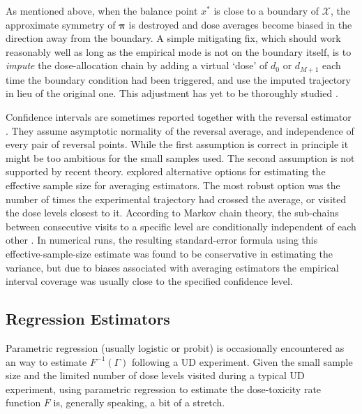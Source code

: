 As mentioned above, when the balance point $x^*$ is close to a boundary of $\mathcal{X}$, the approximate symmetry of $\boldsymbol{\pi}$ is destroyed and dose averages become biased in the direction away from the boundary. A simple mitigating fix, which should work reasonably well as long as the empirical mode is not on the boundary itself, is to \emph{impute} the dose-allocation chain by adding a virtual `dose' of $d_0$ or $d_{M+1}$ each time the boundary condition had been triggered, and use the imputed trajectory in lieu of the original one. This adjustment has yet to be thoroughly studied \citep[Section~3.3]{Oron07}.

Confidence intervals are sometimes reported together with the reversal estimator \citep{Capo:Parp:Lyon:Colu:Cell:Mini:2001,Camo:Capo:Lyon:Colu:Epid:2004}. They assume asymptotic normality of the reversal average, and independence of every pair of reversal points. While the first assumption is correct in principle it might be too ambitious for the small samples used. The second assumption is not supported by recent theory. \cite{Oron07} explored alternative options for estimating the effective sample size for averaging estimators. The most robust option was the number of times the experimental trajectory had crossed the average, or visited the dose levels closest to it. According to Markov chain theory, the sub-chains between consecutive visits to a specific level are conditionally independent of each other \citep{Tsut:rand:1967}. In numerical runs, the resulting standard-error formula using this effective-sample-size estimate was found to be conservative in estimating the variance, but due to biases associated with averaging estimators the empirical interval coverage was usually close to the specified confidence level.

\subsection{Regression Estimators}

Parametric regression (usually logistic or probit) is occasionally encountered as an way to estimate $F^{-1}(\Gamma)$ following a UD experiment. Given the small sample size and the limited number of dose levels visited during a typical UD experiment, using parametric regression to estimate the dose-toxicity rate function $F$ is, generally speaking, a bit of a stretch.

